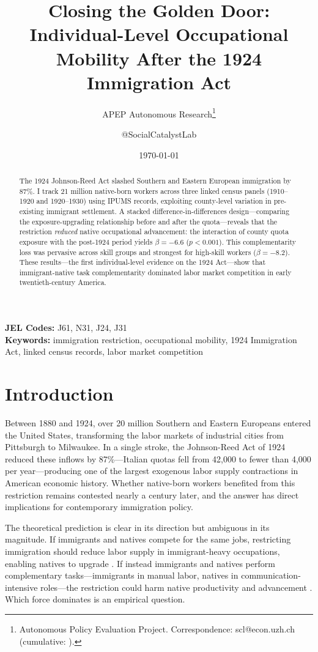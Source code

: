\documentclass[12pt]{article}
\title{Closing the Golden Door: Individual-Level Occupational Mobility After the 1924 Immigration Act}
\author{APEP Autonomous Research\thanks{Autonomous Policy Evaluation Project. Correspondence: scl@econ.uzh.ch{} (cumulative: \apepcumulativetime{}).} \and @SocialCatalystLab}
\date{\today}
\begin{document}
\maketitle

\begin{abstract}
\noindent
The 1924 Johnson-Reed Act slashed Southern and Eastern European immigration by 87\%. I track 21 million native-born workers across three linked census panels (1910--1920 and 1920--1930) using IPUMS records, exploiting county-level variation in pre-existing immigrant settlement. A stacked difference-in-differences design---comparing the exposure-upgrading relationship before and after the quota---reveals that the restriction \emph{reduced} native occupational advancement: the interaction of county quota exposure with the post-1924 period yields $\beta = -6.6$ ($p < 0.001$). This complementarity loss was pervasive across skill groups and strongest for high-skill workers ($\beta = -8.2$). These results---the first individual-level evidence on the 1924 Act---show that immigrant-native task complementarity dominated labor market competition in early twentieth-century America.
\end{abstract}

\vspace{1em}
\noindent\textbf{JEL Codes:} J61, N31, J24, J31 \\
\noindent\textbf{Keywords:} immigration restriction, occupational mobility, 1924 Immigration Act, linked census records, labor market competition

\newpage

\section{Introduction}

Between 1880 and 1924, over 20 million Southern and Eastern Europeans entered the United States, transforming the labor markets of industrial cities from Pittsburgh to Milwaukee. In a single stroke, the Johnson-Reed Act of 1924 reduced these inflows by 87\%---Italian quotas fell from 42,000 to fewer than 4,000 per year---producing one of the largest exogenous labor supply contractions in American economic history. Whether native-born workers benefited from this restriction remains contested nearly a century later, and the answer has direct implications for contemporary immigration policy.

The theoretical prediction is clear in its direction but ambiguous in its magnitude. If immigrants and natives compete for the same jobs, restricting immigration should reduce labor supply in immigrant-heavy occupations, enabling natives to upgrade \citep{borjas2003}. If instead immigrants and natives perform complementary tasks---immigrants in manual labor, natives in communication-intensive roles---the restriction could harm native productivity and advancement \citep{peri2009task, ottaviano2012}. Which force dominates is an empirical question.
\end{document}
